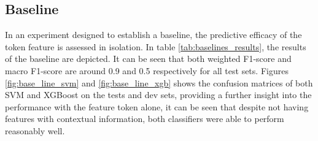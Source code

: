 \subsection{Baseline}


In an experiment designed to establish a baseline, the predictive efficacy of the token feature is assessed in isolation. In table \ref{tab:baselines_results}, the results of the baseline are depicted. It can be seen that both weighted F1-score and macro F1-score are around 0.9 and 0.5 respectively for all test sets. Figures \ref{fig:base_line_svm} and \ref{fig:base_line_xgb} shows the confusion matrices of both SVM and XGBoost on the tests and dev sets, providing a further insight into the performance with the feature token alone, it can be seen that despite not having features with contextual information, both classifiers were able to perform reasonably well.
